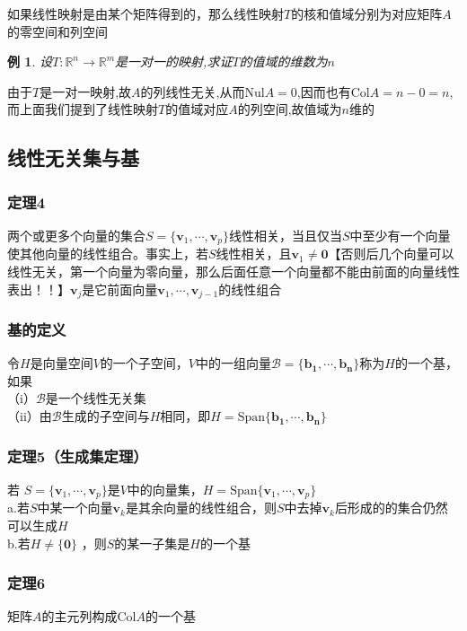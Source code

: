 \documentclass{article}
\newtheorem{example}{例}[subsection]
\newenvironment{cproof}{%
\heiti{证明}\kaishu
}{%
}
\newcommand{\RR}{\mathbb{R}}
\newcommand{\ve}{\boldsymbol}
\newcommand{\col}{\text{Col}}
\newcommand{\nul}{\text{Nul}}
\newcommand{\spans}{\text{Span}}
\begin{document}
\begin{CJK}{UTF8}{gkai}
如果线性映射是由某个矩阵得到的，那么线性映射$T$的核和值域分别为对应矩阵$A$的零空间和列空间\\

\begin{example}
    设$T : \RR^n \to \RR^m$是一对一的映射,求证$T$的值域的维数为$n$
\end{example}

\begin{cproof}
由于$T$是一对一映射,故$A$的列线性无关,从而$\nul A= 0$,因而也有$\col A = n- 0 = n$,而上面我们提到了线性映射$T$的值域对应$A$的列空间,故值域为$n$维的
\end{cproof}
\subsection{线性无关集与基}
\subsubsection{定理4}
两个或更多个向量的集合$S=\{\ve{v}_1,\cdots,\ve{v}_p\}$线性相关，当且仅当$S$中至少有一个向量使其他向量的线性组合。事实上，若$S$线性相关，且$\ve{v}_1\neq\ve{0}$【否则后几个向量可以线性无关，第一个向量为零向量，那么后面任意一个向量都不能由前面的向量线性表出！！】$\ve{v}_j$是它前面向量$\ve{v}_1,\cdots,\ve{v}_{j-1}$的线性组合\\

\subsubsection{基的定义}
令$H$是向量空间$V$的一个子空间，$V$中的一组向量$\mathcal{B}=\{\ve{b_1},\cdots,\ve{b_n}\}$称为$H$的一个基，如果\\
（i）$\mathcal{B}$是一个线性无关集\\
（ii）由$\mathcal{B}$生成的子空间与$H$相同，即$H = \spans\{\ve{b_1},\cdots,\ve{b_n}\}$\\

\subsubsection{定理5（生成集定理）}
若 $S = \{\ve{v}_1,\cdots,\ve{v}_p\} $是$ V $中的向量集，$ H = \spans \{\ve{v}_1,\cdots,\ve{v}_p\} $\\
a.若$S$中某一个向量$\ve{v}_k$是其余向量的线性组合，则$S$中去掉$\ve{v}_k$后形成的的集合仍然可以生成$H$\\
b.若$H \neq \{\ve{0}\}$ ，则$S$的某一子集是$H$的一个基\\
\subsubsection{定理6} 
矩阵$A$的主元列构成$\col A$的一个基\\

\end{CJK}
\end{document}

